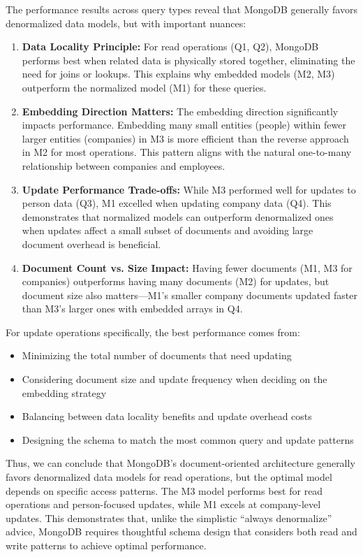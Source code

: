 The performance results across query types reveal that MongoDB generally favors denormalized data models, but with important nuances:
\begin{enumerate}
    \item \textbf{Data Locality Principle:} For read operations (Q1, Q2), MongoDB performs best when related data is physically stored together, eliminating the need for joins or lookups. This explains why embedded models (M2, M3) outperform the normalized model (M1) for these queries.
    \item \textbf{Embedding Direction Matters:} The embedding direction significantly impacts performance. Embedding many small entities (people) within fewer larger entities (companies) in M3 is more efficient than the reverse approach in M2 for most operations. This pattern aligns with the natural one-to-many relationship between companies and employees.
    \item \textbf{Update Performance Trade-offs:} While M3 performed well for updates to person data (Q3), M1 excelled when updating company data (Q4). This demonstrates that normalized models can outperform denormalized ones when updates affect a small subset of documents and avoiding large document overhead is beneficial.
    \item \textbf{Document Count vs. Size Impact:} Having fewer documents (M1, M3 for companies) outperforms having many documents (M2) for updates, but document size also matters—M1's smaller company documents updated faster than M3's larger ones with embedded arrays in Q4.
\end{enumerate}
For update operations specifically, the best performance comes from:
\begin{itemize}
    \item Minimizing the total number of documents that need updating
    \item Considering document size and update frequency when deciding on the embedding strategy
    \item Balancing between data locality benefits and update overhead costs
    \item Designing the schema to match the most common query and update patterns
\end{itemize}

Thus, we can conclude that MongoDB's document-oriented architecture generally favors denormalized data models for read operations, but the optimal model depends on specific access patterns. The M3 model performs best for read operations and person-focused updates, while M1 excels at company-level updates. This demonstrates that, unlike the simplistic \enquote{always denormalize} advice, MongoDB requires thoughtful schema design that considers both read and write patterns to achieve optimal performance.
